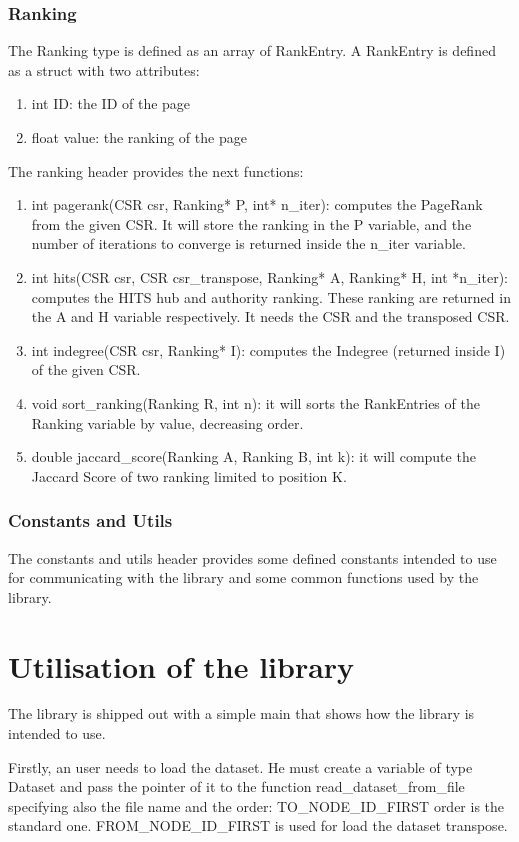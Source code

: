 \documentclass[10pt]{article}
\begin{document}
\subsubsection{Ranking}
The Ranking type is defined as an array of RankEntry.
A RankEntry is defined as a struct with two attributes:
\begin{enumerate}
    \item int ID: the ID of the page
    \item float value: the ranking of the page
\end{enumerate}
The ranking header provides the next functions:
\begin{enumerate}
    \item int pagerank(CSR csr, Ranking* P, int* n\_iter): computes the PageRank from the given CSR. It will store the ranking in the P variable, and the number of iterations to converge is returned inside the n\_iter variable.
    \item int hits(CSR csr, CSR csr\_transpose, Ranking* A, Ranking* H, int *n\_iter): computes the HITS hub and authority ranking. These ranking are returned in the A and H variable respectively. It needs the CSR and the transposed CSR.
    \item int indegree(CSR csr, Ranking* I): computes the Indegree (returned inside I) of the given CSR.
    \item void sort\_ranking(Ranking R, int n): it will sorts the RankEntries of the Ranking variable by value, decreasing order.
    \item double jaccard\_score(Ranking A, Ranking B, int k): it will compute the Jaccard Score of two ranking limited to position K.
\end{enumerate}
\subsubsection{Constants and Utils}
The constants and utils header provides some defined constants intended to use for communicating with the library and some common functions used by the library.
\section{Utilisation of the library}
The library is shipped out with a simple main that shows how the library is intended to use.

Firstly, an user needs to load the dataset. He must create a variable of type Dataset and pass the pointer of it to the function read\_dataset\_from\_file specifying also the file name and the order: TO\_NODE\_ID\_FIRST order is the standard one. FROM\_NODE\_ID\_FIRST is used for load the dataset transpose.
\end{document}
